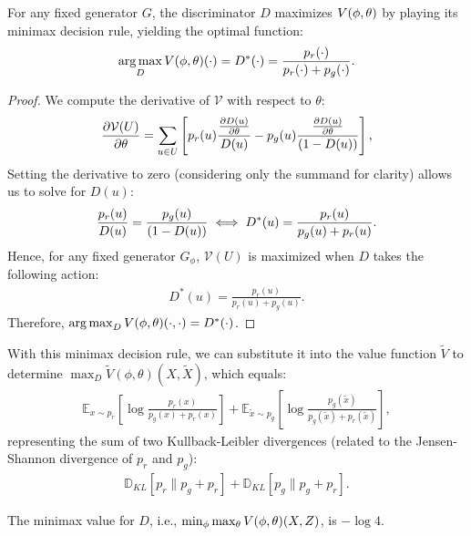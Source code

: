 \begin{theorem}%
	\label{theorem:minimax}
	For any fixed generator $G$, the discriminator $D$ maximizes $V(\phi, \theta)$ by playing its minimax
	decision rule, yielding the optimal function:
	\begin{align}
		\operatorname*{arg\,max}_{D}V(\phi, \theta)(\cdot) = D^*(\cdot) = \frac{p_r(\cdot)}{p_r(\cdot) + p_g(\cdot)}.
	\end{align}
\end{theorem}

\begin{proof}
	We compute the derivative of $\mathcal{V}$ with respect to $\theta$:
	\begin{align}
		\label{eq:derivatives}
		{\partial \mathcal{V}(U) \over \partial \theta} = \sum_{u \in U}\left[ p_r(u) { {\partial D(u) \over \partial \theta} \over D(u)} -
			p_g(u) {{\partial D(u) \over \partial \theta} \over (1 - D(u))}\right],
	\end{align}
	Setting the derivative to zero (considering only the summand for clarity) allows us to solve for $D(u)$:
	\begin{align}
		\label{eq:20}
		{p_r(u) \over D(u)} = {p_g(u) \over (1 - D(u))} \iff D^*(u) = {p_r(u) \over p_g(u) + p_r(u)}.
	\end{align}
	Hence, for any fixed generator $G_\phi$, $\mathcal{V}(U)$ is maximized when $D$ takes the following action:
	\begin{align}
		\label{eq:13}
		D^*(u) = \frac{p_r(u)}{p_r(u) + p_g(u)}.
	\end{align}
	Therefore, $\operatorname*{arg\,max}_{D}V(\phi, \theta)(\cdot, \cdot) = D^*(\cdot)$.
\end{proof}

With this minimax decision rule, we can substitute it into the value function $\tilde{V}$ to determine $\max_{D}\tilde{V}(\phi, \theta)(X, \tilde{X})$, which equals:
\begin{align}
	\label{eq:sum-of-two-kl-divergences}
	\mathbb{E}_{x \sim p_r}\left[\log{\frac{p_r(x)}{p_{g}(x)+ p_r(x)}}\right] + \mathbb{E}_{\tilde{x} \sim p_g}\left[\log{\frac{p_g(\tilde{x})}{p_g(\tilde{x}) + p_r(\tilde{x})}} \right],
\end{align}
representing the sum of two Kullback-Leibler divergences (related to the Jensen-Shannon divergence of $p_r$ and $p_g$):
\begin{align}
	\label{eq:16}
	\mathbb{D}_{KL}[p_r \| p_{g} + p_r] + \mathbb{D}_{KL}[p_g \| p_g + p_r].
\end{align}

\begin{lemma}
	The minimax value for $D$, i.e., $\min_{\phi}\max_{\theta}V(\phi, \theta)(X, Z)$, is $-\log{4}$.
\end{lemma}

